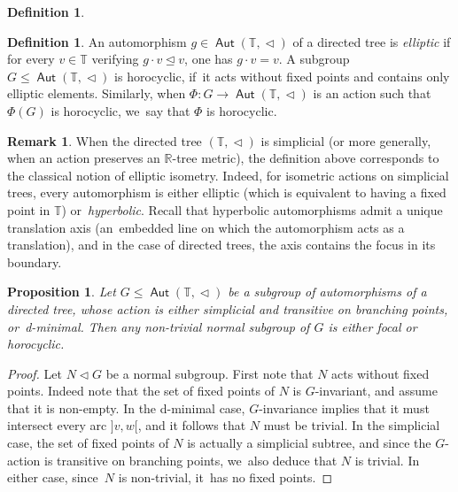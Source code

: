 \documentclass[JEP,XML,SOM,Unicode,NoFloatCountersInSection,published]{cedram}
\newtheorem{prop}[thm]{Proposition}
\theoremstyle{definition}
\newtheorem{dfn}[thm]{Definition}
\newtheorem{rem}[thm]{Remark}
\DeclareMathOperator{\Aut}{\mathsf{Aut}}
\newcommand{\R}{\mathbb{R}}
\newcommand{\Tbb}{\mathbb T}
\newcommand{\treeorder}{\mathrel{\triangleleft}}
\newcommand{\treeordereq}{\mathrel{\trianglelefteq}}
\begin{document}
\begin{dfn}
\begin{dfn}
An automorphism $g\in \Aut(\Tbb,\treeorder)$ of a directed tree is \emph{elliptic} if for every $v\in\Tbb$ verifying $g\cdot v\treeordereq v$, one has $g\cdot v=v$.
A subgroup $G\leq \Aut(\Tbb,\treeorder)$ is {horocyclic}, if~it acts without fixed points and contains only elliptic elements. Similarly, when $\Phi\colon G\to \Aut(\Tbb,\treeorder)$ is an action such that $\Phi(G)$ is horocyclic, we~say that $\Phi$ is {horocyclic}.
\end{dfn}

\begin{rem}\label{r.isometries}
When the directed tree $(\Tbb,\treeorder)$ is simplicial (or more generally, when an action preserves an $\R$-tree metric), the definition above corresponds to the classical notion of elliptic isometry. Indeed, for isometric actions on simplicial trees, every automorphism is either elliptic (which is equivalent to having a fixed point in $\Tbb$) or~\emph{hyperbolic}. Recall that hyperbolic automorphisms admit a unique translation axis (an~embedded line on which the automorphism acts as a translation), and in the case of directed trees, the axis contains the focus in its boundary.
\end{rem}

\begin{prop}\label{p-focal-normal}
Let $G\leq \Aut(\Tbb, \treeorder)$ be a subgroup of automorphisms of a directed tree, whose action is either simplicial and transitive on branching points, or~d\nobreakdash-mini\-mal. Then any non-trivial normal subgroup of $G$ is either focal or horocyclic.
\end{prop}

\begin{proof}
Let $N\lhd G$ be a normal subgroup. First note that $N$ acts without fixed points. Indeed note that the set of fixed points of $N$ is $G$-invariant, and assume that it is non-empty. In the d-minimal case, $G$-invariance implies that it must intersect every arc $]v, w[$, and it follows that $N$ must be trivial. In the simplicial case, the set of fixed points of $N$ is actually a simplicial subtree, and since the $G$-action is transitive on branching points, we~also deduce that $N$ is trivial. In either case, since~$N$ is non-trivial, it~has no fixed points.


\end{proof}
\end{dfn}
\end{document}
